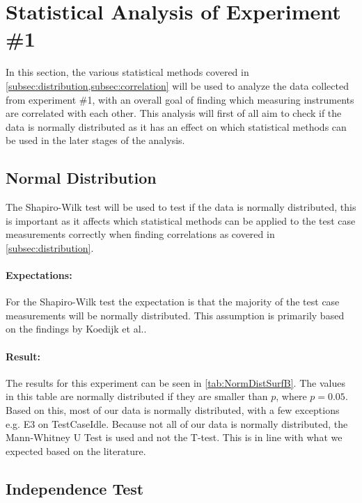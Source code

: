 \section{Statistical Analysis of Experiment \#1}\label{sec:Stat1}

In this section, the various statistical methods covered in \cref{subsec:distribution,subsec:correlation} will be used to analyze the data collected from experiment \#1, with an overall goal of finding which measuring instruments are correlated with each other. This analysis will first of all aim to check if the data is normally distributed as it has an effect on which statistical methods can be used in the later stages of the analysis.

\subsection{Normal Distribution}\label{subsec:NormalDist1}
The Shapiro-Wilk test will be used to test if the data is normally distributed, this is important as it affects which statistical methods can be applied to the test case measurements correctly when finding correlations as covered in \cref{subsec:distribution}.

\paragraph{Expectations:} For the Shapiro-Wilk test the expectation is that the majority of the test case measurements will be normally distributed. This assumption is primarily based on the findings by Koedijk et al.\cite{Koedijk2022diff}.

\paragraph{Result:} The results for this experiment can be seen in \cref{tab:NormDistSurfB}. The values in this table are normally distributed if they are smaller than $p$, where $p = 0.05$\cite{wasserstein2019moving}. Based on this, most of our data is normally distributed, with a few exceptions e.g. E3 on TestCaseIdle. Because not all of our data is normally distributed, the Mann-Whitney U Test is used and not the T-test. This is in line with what we expected based on the literature.



\subsection{Independence Test}\label{subsec:independence1}

